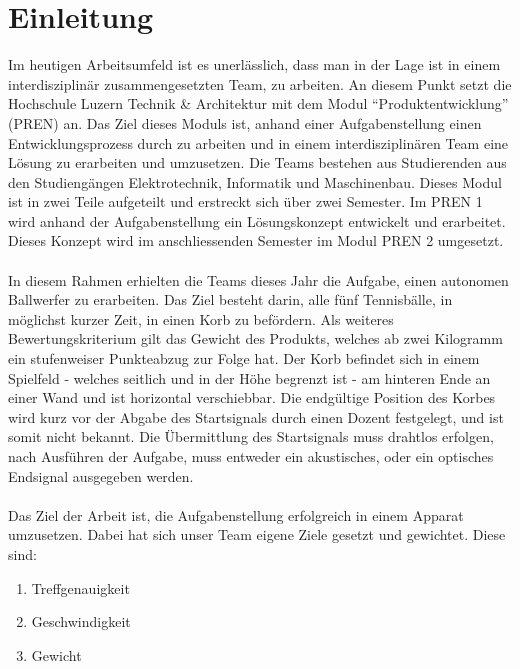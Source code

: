 ﻿\section{Einleitung}
Im heutigen Arbeitsumfeld ist es unerlässlich, dass man in der Lage ist in einem interdisziplinär zusammengesetzten Team, zu arbeiten. An diesem Punkt setzt die Hochschule Luzern Technik \& Architektur mit dem Modul \enquote{Produktentwicklung} (PREN) an. Das Ziel dieses Moduls ist, anhand einer Aufgabenstellung einen Entwicklungsprozess durch zu arbeiten und in einem interdisziplinären Team eine Lösung zu erarbeiten und umzusetzen. Die Teams bestehen aus Studierenden aus den Studiengängen Elektrotechnik, Informatik und Maschinenbau. Dieses Modul ist in zwei Teile aufgeteilt und erstreckt sich über zwei Semester. Im PREN 1 wird anhand der Aufgabenstellung ein Lösungskonzept entwickelt und erarbeitet. Dieses Konzept wird im anschliessenden Semester im Modul PREN 2 umgesetzt.\\
\\
In diesem Rahmen erhielten die Teams dieses Jahr die Aufgabe, einen autonomen Ballwerfer zu erarbeiten. Das Ziel besteht darin, alle fünf Tennisbälle, in möglichst kurzer Zeit, in einen Korb zu befördern. Als weiteres Bewertungskriterium gilt das Gewicht des Produkts, welches ab zwei Kilogramm ein stufenweiser Punkteabzug zur Folge hat. Der Korb befindet sich in einem Spielfeld - welches seitlich und in der Höhe begrenzt ist - am hinteren Ende an einer Wand und ist horizontal verschiebbar. Die endgültige Position des Korbes wird kurz vor der Abgabe des Startsignals durch einen Dozent festgelegt, und ist somit nicht bekannt. Die Übermittlung des Startsignals muss drahtlos erfolgen, nach Ausführen der Aufgabe, muss entweder ein akustisches, oder ein optisches Endsignal ausgegeben werden.\\
\\
Das Ziel der Arbeit ist, die Aufgabenstellung erfolgreich in einem Apparat umzusetzen. Dabei hat sich unser Team eigene Ziele gesetzt und gewichtet. Diese sind:
\begin{enumerate}
    \item Treffgenauigkeit
    \item Geschwindigkeit
    \item Gewicht
\end{enumerate}
